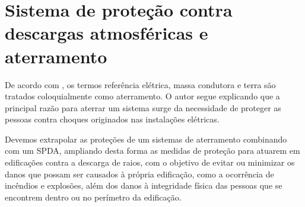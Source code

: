 \section{Sistema de proteção contra descargas atmosféricas e aterramento} \label{section: SPDA-ATT}

De acordo com \cite{mattostecnicas}, os termos referência elétrica, massa condutora e terra são tratados coloquialmente como aterramento. O autor segue explicando que a principal razão para aterrar um sistema surge da necessidade de proteger as pessoas contra choques originados nas instalações elétricas.

Devemos extrapolar as proteções de um sistemas de aterramento combinando  com um SPDA, ampliando desta forma as medidas de proteção para  atuarem em edificações contra a descarga de raios, com o objetivo de evitar ou minimizar os danos que possam ser causados à própria edificação, como a ocorrência de incêndios e explosões, além dos danos à integridade física das pessoas que se encontrem dentro ou no perímetro da edificação.







\newpage
